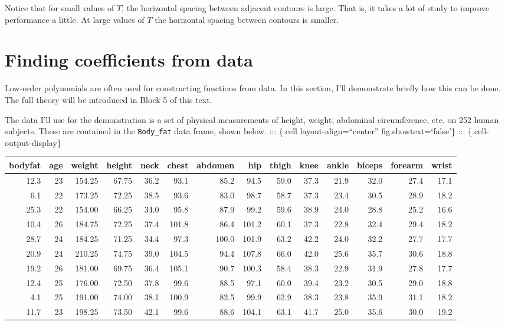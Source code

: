 \documentclass[
  letterpaper,
  DIV=11,
  numbers=noendperiod,
  oneside]{scrreprt}
\begin{document}
Notice that for small values of \(T\), the horizontal spacing between
adjacent contours is large. That is, it takes a lot of study to improve
performance a little. At large values of \(T\) the horizontal spacing
between contours is smaller.

\hypertarget{finding-coefficients-from-data}{%
\section{Finding coefficients from
data}\label{finding-coefficients-from-data}}

Low-order polynomials are often used for constructing functions from
data. In this section, I'll demonstrate briefly how this can be done.
The full theory will be introduced in Block 5 of this text.

The data I'll use for the demonstration is a set of physical
measurements of height, weight, abdominal circumference, etc. on 252
human subjects. These are contained in the \texttt{Body\_fat} data
frame, shown below. ::: \{.cell layout-align=``center''
fig.showtext=`false'\} ::: \{.cell-output-display\}

\begin{tabular}{r|r|r|r|r|r|r|r|r|r|r|r|r|r}
\hline
bodyfat & age & weight & height & neck & chest & abdomen & hip & thigh & knee & ankle & biceps & forearm & wrist\\
\hline
12.3 & 23 & 154.25 & 67.75 & 36.2 & 93.1 & 85.2 & 94.5 & 59.0 & 37.3 & 21.9 & 32.0 & 27.4 & 17.1\\
\hline
6.1 & 22 & 173.25 & 72.25 & 38.5 & 93.6 & 83.0 & 98.7 & 58.7 & 37.3 & 23.4 & 30.5 & 28.9 & 18.2\\
\hline
25.3 & 22 & 154.00 & 66.25 & 34.0 & 95.8 & 87.9 & 99.2 & 59.6 & 38.9 & 24.0 & 28.8 & 25.2 & 16.6\\
\hline
10.4 & 26 & 184.75 & 72.25 & 37.4 & 101.8 & 86.4 & 101.2 & 60.1 & 37.3 & 22.8 & 32.4 & 29.4 & 18.2\\
\hline
28.7 & 24 & 184.25 & 71.25 & 34.4 & 97.3 & 100.0 & 101.9 & 63.2 & 42.2 & 24.0 & 32.2 & 27.7 & 17.7\\
\hline
20.9 & 24 & 210.25 & 74.75 & 39.0 & 104.5 & 94.4 & 107.8 & 66.0 & 42.0 & 25.6 & 35.7 & 30.6 & 18.8\\
\hline
19.2 & 26 & 181.00 & 69.75 & 36.4 & 105.1 & 90.7 & 100.3 & 58.4 & 38.3 & 22.9 & 31.9 & 27.8 & 17.7\\
\hline
12.4 & 25 & 176.00 & 72.50 & 37.8 & 99.6 & 88.5 & 97.1 & 60.0 & 39.4 & 23.2 & 30.5 & 29.0 & 18.8\\
\hline
4.1 & 25 & 191.00 & 74.00 & 38.1 & 100.9 & 82.5 & 99.9 & 62.9 & 38.3 & 23.8 & 35.9 & 31.1 & 18.2\\
\hline
11.7 & 23 & 198.25 & 73.50 & 42.1 & 99.6 & 88.6 & 104.1 & 63.1 & 41.7 & 25.0 & 35.6 & 30.0 & 19.2\\
\hline
\end{tabular}
\end{document}
